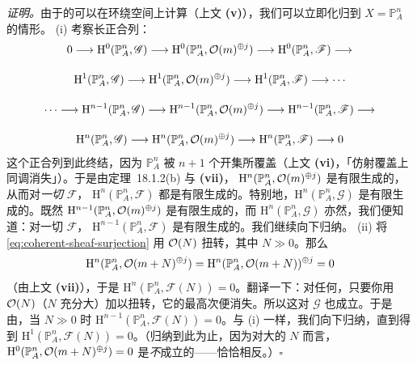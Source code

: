 \emph{证明。}\quad 由于\trClosedSubscheme{}的\trCohomology{}可以在环绕空间上计算（上文 \textbf{(v)}），我们可以立即化归到 $X=\mathbb{P}^n_A$ 的情形。
(i) 考察长正合列：
\[
\begin{gathered}
0\longrightarrow \mathrm{H}^0(\mathbb{P}^n_A,\mathscr{G})\longrightarrow \mathrm{H}^0(\mathbb{P}^n_A,\mathcal{O}(m)^{\oplus j})\longrightarrow \mathrm{H}^0(\mathbb{P}^n_A,\mathscr{F})\longrightarrow\\[10pt]
\mathrm{H}^1(\mathbb{P}^n_A,\mathscr{G})\longrightarrow \mathrm{H}^1(\mathbb{P}^n_A,\mathcal{O}(m)^{\oplus j})\longrightarrow \mathrm{H}^1(\mathbb{P}^n_A,\mathscr{F})\longrightarrow\cdots\\[10pt]
\cdots\longrightarrow \mathrm{H}^{n-1}(\mathbb{P}^n_A,\mathscr{G})\longrightarrow \mathrm{H}^{n-1}(\mathbb{P}^n_A,\mathcal{O}(m)^{\oplus j})\longrightarrow \mathrm{H}^{n-1}(\mathbb{P}^n_A,\mathscr{F})\longrightarrow\\[10pt]
\mathrm{H}^n(\mathbb{P}^n_A,\mathscr{G})\longrightarrow \mathrm{H}^n(\mathbb{P}^n_A,\mathcal{O}(m)^{\oplus j})\longrightarrow \mathrm{H}^n(\mathbb{P}^n_A,\mathscr{F})\longrightarrow 0
\end{gathered}
\]
这个正合列到此终结，因为 $\mathbb{P}^n_A$ 被 $n+1$ 个\trAffine{}开集所覆盖（上文 \textbf{(vi)}，「仿射覆盖上同调消失」）。于是由\mbox{定理~18.1.2(b)} 与 \textbf{(vii)}，
$\mathrm{H}^n(\mathbb{P}^n_A,\mathcal{O}(m)^{\oplus j})$ 是有限生成的，从而对\emph{一切}\trCoherentSheaf{} $\mathscr{F}$，
$\mathrm{H}^n(\mathbb{P}^n_A,\mathscr{F})$ 都是有限生成的。特别地，$\mathrm{H}^n(\mathbb{P}^n_A,\mathscr{G})$ 是有限生成的。既然
$\mathrm{H}^{n-1}(\mathbb{P}^n_A,\mathcal{O}(m)^{\oplus j})$ 是有限生成的，而 $\mathrm{H}^n(\mathbb{P}^n_A,\mathscr{G})$ 亦然，我们便知道：对一切\trCoherentSheaf{} $\mathscr{F}$，
$\mathrm{H}^{n-1}(\mathbb{P}^n_A,\mathscr{F})$ 是有限生成的。我们继续向下归纳。
(ii) 将 \eqref{eq:coherent-sheaf-surjection} 用 $\mathcal{O}(N)$ 扭转，其中 $N\gg 0$。那么
\[
\mathrm{H}^n(\mathbb{P}^n_A,\mathcal{O}(m+N)^{\oplus j})=\mathrm{H}^n(\mathbb{P}^n_A,\mathcal{O}(m+N))^{\oplus j}=0
\]
（由上文 \textbf{(vii)}），于是 $\mathrm{H}^n(\mathbb{P}^n_A,\mathscr{F}(N))=0$。翻译一下：对任何\trCoherentSheaf，只要你用 $\mathcal{O}(N)$（$N$ 充分大）加以扭转，它的最高次\trCohomology{}便消失。所以这对 $\mathscr{G}$ 也成立。于是由\trLongExactSequence，当 $N\gg 0$ 时
$\mathrm{H}^{n-1}(\mathbb{P}^n_A,\mathscr{F}(N))=0$。与 (i) 一样，我们向下归纳，直到得到
$\mathrm{H}^1(\mathbb{P}^n_A,\mathscr{F}(N))=0$。（归纳到此为止，因为对大的 $N$ 而言，
$\mathrm{H}^0(\mathbb{P}^n_A,\mathcal{O}(m+N)^{\oplus j})=0$ 是\emph{不}成立的——恰恰相反。）\hfill$\square$

